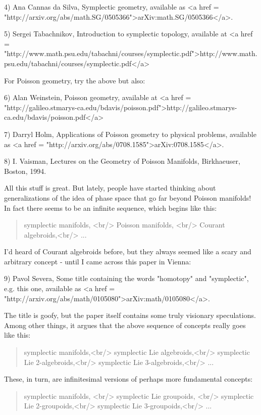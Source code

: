 4) Ana Cannas da Silva, Symplectic geometry, available as 
<a href = "http://arxiv.org/abs/math.SG/0505366">arXiv:math.SG/0505366</a>.

5) Sergei Tabachnikov, Introduction to symplectic topology, 
available at <a href = "http://www.math.psu.edu/tabachni/courses/symplectic.pdf">http://www.math.psu.edu/tabachni/courses/symplectic.pdf</a>

For Poisson geometry, try the above but also:

6) Alan Weinstein, Poisson geometry, available at
<a href = "http://galileo.stmarys-ca.edu/bdavis/poisson.pdf">http://galileo.stmarys-ca.edu/bdavis/poisson.pdf</a>

7) Darryl Holm, Applications of Poisson geometry to physical 
problems, available as <a href = "http://arxiv.org/abs/0708.1585">arXiv:0708.1585</a>.

8) I. Vaisman, Lectures on the Geometry of Poisson Manifolds, 
Birkhaeuser, Boston, 1994.

All this stuff is great.  But lately, people have started thinking 
about generalizations of the idea of phase space that go far beyond 
Poisson manifolds!  In fact there seems to be an infinite sequence,
which begins like this:

\begin{quote}
 symplectic manifolds, <br/>
 Poisson manifolds, <br/>
 Courant algebroids,<br/>
 ...
\end{quote}

I'd heard of Courant algebroids before, but they always seemed
like a scary and arbitrary concept - until I came across this 
paper in Vienna:


 9) Pavol Severa, Some title containing the words
"homotopy" and "symplectic", e.g. this one,
available as <a href =
"http://arxiv.org/abs/math/0105080">arXiv:math/0105080</a>.

The title is goofy, but the paper itself contains some truly
visionary speculations.  Among other things, it argues that the 
above sequence of concepts really goes like this:
 
\begin{quote}
 symplectic manifolds,<br/>
 symplectic Lie algebroids,<br/>
 symplectic Lie 2-algebroids,<br/>
 symplectic Lie 3-algebroids,<br/>
 ...
\end{quote}

These, in turn, are infinitesimal versions of perhaps more fundamental
concepts:

\begin{quote}
 symplectic manifolds, <br/>
 symplectic Lie groupoids, <br/>
 symplectic Lie 2-groupoids,<br/>
 symplectic Lie 3-groupoids,<br/>
 ...
\end{quote}

